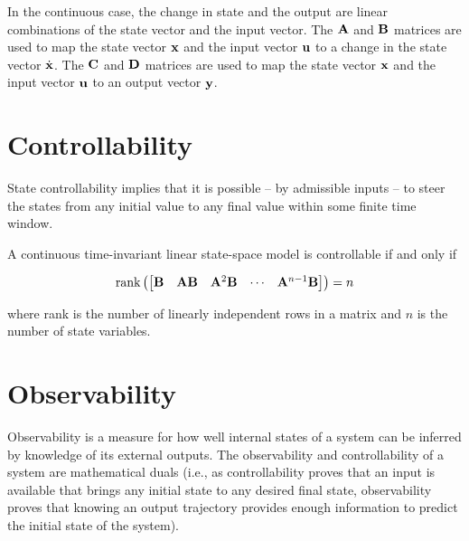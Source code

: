 In the continuous case, the change in state and the output are linear
combinations of the state vector and the input vector. The $\mathbf{A}$ and
$\mathbf{B}$ matrices are used to map the state vector $\mathbf{x}$ and the input
vector $\mathbf{u}$ to a change in the state vector $\dot{\mathbf{x}}$. The $\mathbf{C}$
and $\mathbf{D}$ matrices are used to map the state vector $\mathbf{x}$ and the input
vector $\mathbf{u}$ to an output vector $\mathbf{y}$.

\section{Controllability}

State controllability implies that it is possible -- by admissible inputs -- to
steer the \glspl{state} from any initial value to any final value within some
finite time window.

\begin{theorem}[Controllability]
  A continuous \gls{time-invariant} linear state-space \gls{model} is
  controllable if and only if

  \begin{equation}
    \text{rank} \left(
    \begin{bmatrix}
      \mathbf{B} & \mathbf{A}\mathbf{B} & \mathbf{A}^2\mathbf{B} & \cdots &
      \mathbf{A}^{n-1}\mathbf{B}
    \end{bmatrix}
    \right) = n
    \label{eq:ctrl_rank}
  \end{equation}

  where rank is the number of linearly independent rows in a matrix and $n$ is
  the number of \gls{state} variables.
\end{theorem}

\section{Observability}

Observability is a measure for how well internal \glspl{state} of a \gls{system}
can be inferred by knowledge of its external outputs. The observability and
controllability of a \gls{system} are mathematical duals (i.e., as
controllability proves that an input is available that brings any initial
\gls{state} to any desired final \gls{state}, observability proves that knowing
an output trajectory provides enough information to predict the initial
\gls{state} of the \gls{system}).

